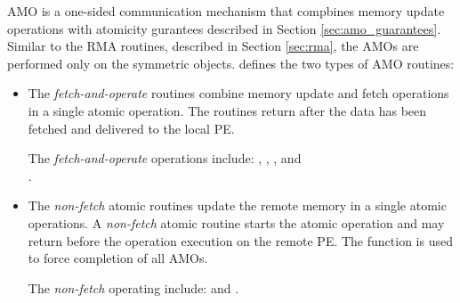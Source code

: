 \label{sec:amo}
\ac{AMO} is a one-sided communication mechanism that compbines memory update operations with atomicity gurantees described in Section \ref{sec:amo_guarantees}. 
Similar to the \ac{RMA} routines, described in Section \ref{sec:rma},
the \acp{AMO} are performed only on the symmetric objects. 
\openshmem{} defines the two types of \ac{AMO} routines:
\begin{itemize}
\item %
The \textit{fetch-and-operate} routines combine memory update and fetch 
operations in a single atomic operation.
The routines return after the data has been fetched and delivered to the local \ac{PE}.

The \textit{fetch-and-operate} operations include: , , , and\\ .

\item %
The \textit{non-fetch} atomic routines update the remote memory 
in a single atomic operations.
A \textit{non-fetch} atomic routine
starts the atomic operation and may return before the operation execution
on the remote \ac{PE}.
The  function is used to force completion of all \acp{AMO}.

The \textit{non-fetch} operating include:  and .
\end{itemize}
